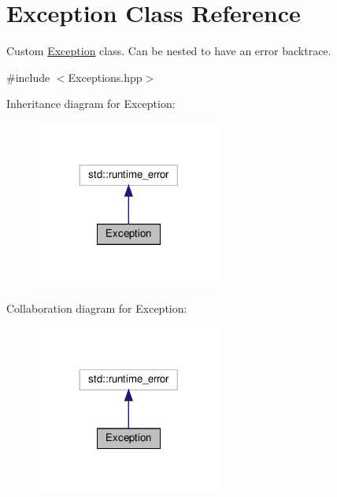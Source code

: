 \hypertarget{classException}{}\section{Exception Class Reference}
\label{classException}


Custom \hyperlink{classException}{Exception} class. Can be nested to have an error backtrace.  




{\ttfamily \#include $<$Exceptions.\+hpp$>$}



Inheritance diagram for Exception\+:\nopagebreak
\begin{figure}[H]
\begin{center}
\leavevmode
\includegraphics[width=173pt]{classException__inherit__graph}
\end{center}
\end{figure}


Collaboration diagram for Exception\+:\nopagebreak
\begin{figure}[H]
\begin{center}
\leavevmode
\includegraphics[width=173pt]{classException__coll__graph}
\end{center}
\end{figure}

